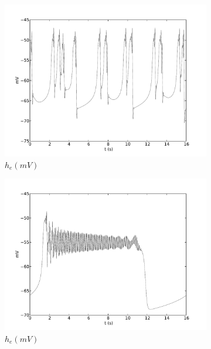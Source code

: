 \documentclass[a4paper,12pt]{article}
\begin{document}
\begin{figure}
\begin{subfigure}[b]{0.5\textwidth}
		\includegraphics[scale=0.35]{frontiers-2012-images-revised/effect_gamma_ee_yml-00143_ode-burst-thal-rev_yml-thal-rev-mod-0_9-0_5-1-save_yml-he-thal.pdf}
		\caption{$h_e (mV)$}
	\end{subfigure}
	\begin{subfigure}[b]{0.5\textwidth}
		\includegraphics[scale=0.35]{frontiers-2012-images-revised/effect_gamma_ee_yml-00143_ode-burst-thal-rev_yml-thal-rev-mod-1-0_7-1-save_yml-he-thal.pdf}
		\caption{$h_e (mV)$}
	\end{subfigure}
	\begin{subfigure}[b]{0.5\textwidth}

\end{subfigure}
\end{figure}
\end{document}

